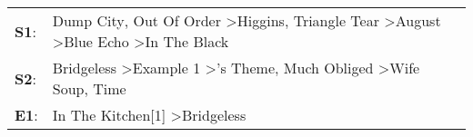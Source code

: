 \begin{supertabular}{p{0.03\textwidth}p{0.92\textwidth}}
 \textbf{S1}:  &  Dump City\textsuperscript{}, \enspace Out Of Order\textsuperscript{} \textgreater \enspace Higgins\textsuperscript{}, \enspace Triangle Tear\textsuperscript{} \textgreater \enspace August\textsuperscript{} \textgreater \enspace Blue Echo\textsuperscript{} \textgreater \enspace In The Black\textsuperscript{}  \enspace  \\
 \textbf{S2}:  &                                                         Bridgeless\textsuperscript{} \textgreater \enspace Example 1\textsuperscript{} \textgreater {}'s Theme\textsuperscript{}, \enspace Much Obliged\textsuperscript{} \textgreater \enspace Wife Soup\textsuperscript{}, \enspace Time\textsuperscript{}  \enspace  \\
 \textbf{E1}:  &                                                                                                                                                                                                                                In The Kitchen[1]\textsuperscript{} \textgreater \enspace Bridgeless\textsuperscript{}  \enspace  \\
\end{supertabular}
